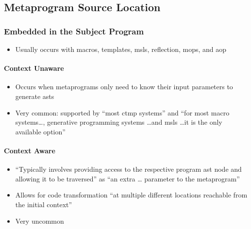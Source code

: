 \subsection{Metaprogram Source Location}
\subsubsection{Embedded in the Subject Program \citep[p.~113:25-26]{lilis_survey_2019}}
\begin{itemize}
      \item Usually occurs with macros, templates, \acsp{msl}, reflection,
            \acsp{mop}, and \acs{aop} \citep[p.~113:25]{lilis_survey_2019}
\end{itemize}

\paragraph{Context Unaware \citep[p.~113:25]{lilis_survey_2019}}
\begin{itemize}
      \item Occurs when metaprograms only need to know their input parameters
            to generate \acsp{ast} \citep[p.~113:25]{lilis_survey_2019}
      \item Very common: supported by ``most \acs{ctmp} systems''
            \citep[p.~113:31]{lilis_survey_2019} and ``for most macro
            systems\dots, generative programming systems \dots and \acsp{msl}
            \dots it is the only available option'' \citep[p.~113:25]{lilis_survey_2019}
\end{itemize}

\paragraph{Context Aware \citep[p.~113:25-26]{lilis_survey_2019}}
\begin{itemize}
      \item ``Typically involves providing access to the respective program
            \acs{ast} node and allowing it to be traversed'' as ``an extra \dots
            parameter to the metaprogram'' \citep[p.~113:25]{lilis_survey_2019}
      \item Allows for code transformation ``at multiple different locations
            reachable from the initial context'' \citep[p.~113:25]{lilis_survey_2019}
      \item Very uncommon \citep[p.~113:25,~31]{lilis_survey_2019}
\end{itemize}

